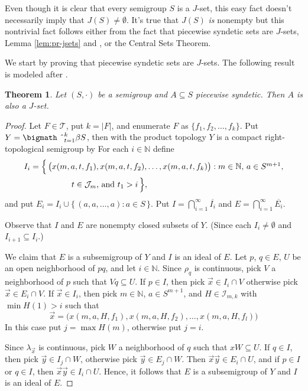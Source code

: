 \documentclass[12pt]{article}
\theoremstyle{plain}
\newtheorem{thm}{Theorem}[section]
\theoremstyle{definition}
\newcommand{\bbN}{\mathbb{N}}
\newcommand{\calI}{\mathcal{I}}
\newcommand{\calJ}{\mathcal{J}}
\newcommand{\calT}{\mathcal{T}}
\newcommand{\bigtimes}{\hbox{\bigmath \char'2}}
\begin{document}
Even though it is clear that every semigroup $S$ is a $J$-set, this easy fact doesn't necessarily imply that $J(S) \ne \emptyset$.
It's true that $J(S)$ \textsl{is} nonempty but this nontrivial fact follows either from the fact that piecewise syndetic sets are $J$-sets, Lemma \ref{lem:pr-jsets} and \cite[Theorem 3.11]{Hindman:1998fk}, or the Central Sets Theorem. 

We start by proving that piecewise syndetic sets are $J$-sets.
The following result is modeled after \cite[Theorems 14.1 and 14.7]{Hindman:1998fk}. 

\begin{thm}
  Let $(S, \cdot)$ be a semigroup and $A \subseteq S$ piecewise syndetic.
  Then $A$ is also a $J$-set.
\end{thm}
\begin{proof}
  Let $F \in \calT$, put $k = |F|$, and enumerate $F$ as $\{f_1, f_2, \ldots, f_k\}$.
  Put $Y = \bigtimes_{t=1}^k \beta S$, then with the product topology $Y$ is a compact right-topological semigroup by \cite[Theorem 2.22]{Hindman:1998fk}
  For each $i \in \bbN$ define
  \begin{align*}
    I_i &= \Bigl\{\, \bigl( x(m, a, t, f_1), x(m, a, t, f_2), \ldots,
    x(m, a, t, f_k) \bigr) : \mbox{$m \in \bbN$, $a \in S^{m+1}$,} \\
    &\hspace{5em} \mbox{$t \in \calJ_m$, and $t_1 > i$}
    \,\Bigr\},
  \end{align*}
  and put $E_i = I_i \cup \{\, (a, a, \ldots, a) : a \in S \,\}$.
  Put $I = \bigcap_{i=1}^\infty \overline{I_i}$ and $E = \bigcap_{i=1}^\infty \overline{E_i}$.

  Observe that $I$ and $E$ are nonempty closed subsets of $Y$.
  (Since each $I_i \ne \emptyset$ and $I_{i+1} \subseteq I_i$.)

  We claim that $E$ is a subsemigroup of $Y$ and $I$ is an ideal of $E$.
  Let $p$, $q \in E$, $U$ be an open neighborhood of $pq$, and let $i \in \bbN$. 
  Since $\rho_q$ is continuous, pick $V$ a neighborhood of $p$ such that $Vq \subseteq U$. 
  If $p \in I$, then pick $\vec{x} \in I_i \cap V$ otherwise pick $\vec{x} \in E_i \cap V$.
  If $\vec{x} \in I_i$, then pick $m \in \bbN$, $a \in S^{m+1}$, and $H \in \calI_{m,k}$ with $\min H(1) > i$ such that
  \[
    \vec{x} = \bigl( x(m, a, H, f_1), x(m, a, H, f_2), \ldots, x(m,
    a, H, f_l) \bigr)
  \]
  In this case put $j = \max H(m)$, otherwise put $j=i$. 

  Since $\lambda_{\vec{x}}$ is continuous, pick $W$ a neighborhood of $q$ such that $xW \subseteq U$. 
  If $q \in I$, then pick $\vec{y} \in I_j \cap W$, otherwise pick $\vec{y} \in E_j \cap W$.
  Then $\vec{x} \vec{y} \in E_i \cap U$, and if $p \in I$ or $q \in I$, then $\vec{x} \vec{y} \in I_i \cap U$. 
  Hence, it follows that $E$ is a subsemigroup of $Y$ and $I$ is an ideal of $E$.


\end{proof}
\end{document}
